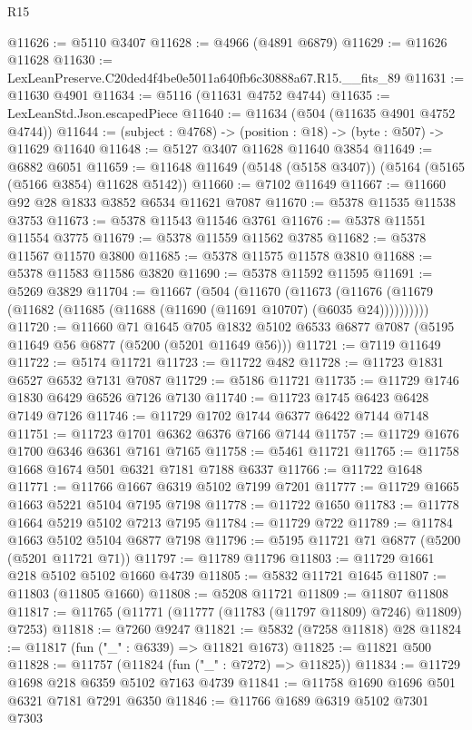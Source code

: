 \begin{lexlean}{R15}
\begin{coremodule}
{{{{{{{{{{{@11626 := @5110 @3407
@11628 := @4966 (@4891 @6879)
@11629 := @11626 @11628
@11630 := LexLeanPreserve.C20ded4f4be0e5011a640fb6c30888a67.R15.__fits_89
@11631 := @11630 @4901
@11634 := @5116 (@11631 @4752 @4744)
@11635 := LexLeanStd.Json.escapedPiece
@11640 := @11634 (@504 (@11635 @4901 @4752 @4744))
@11644 := (subject : @4768) -> (position : @18) -> (byte : @507) -> @11629 @11640
@11648 := @5127 @3407 @11628 @11640 @3854
@11649 := @6882 @6051
@11659 := @11648 @11649 (@5148 (@5158 @3407)) (@5164 (@5165 (@5166 @3854) @11628 @5142))
@11660 := @7102 @11649
@11667 := @11660 @92 @28 @1833 @3852 @6534 @11621 @7087
@11670 := @5378 @11535 @11538 @3753
@11673 := @5378 @11543 @11546 @3761
@11676 := @5378 @11551 @11554 @3775
@11679 := @5378 @11559 @11562 @3785
@11682 := @5378 @11567 @11570 @3800
@11685 := @5378 @11575 @11578 @3810
@11688 := @5378 @11583 @11586 @3820
@11690 := @5378 @11592 @11595
@11691 := @5269 @3829
@11704 := @11667
    (@504
      (@11670
        (@11673 (@11676 (@11679 (@11682 (@11685 (@11688 (@11690 (@11691 @10707) (@6035 @24))))))))))
@11720 := @11660
    @71
    @1645
    @705
    @1832
    @5102
    @6533
    @6877
    @7087
    (@5195 @11649 @56 @6877 (@5200 (@5201 @11649 @56)))
@11721 := @7119 @11649
@11722 := @5174 @11721
@11723 := @11722 @482
@11728 := @11723 @1831 @6527 @6532 @7131 @7087
@11729 := @5186 @11721
@11735 := @11729 @1746 @1830 @6429 @6526 @7126 @7130
@11740 := @11723 @1745 @6423 @6428 @7149 @7126
@11746 := @11729 @1702 @1744 @6377 @6422 @7144 @7148
@11751 := @11723 @1701 @6362 @6376 @7166 @7144
@11757 := @11729 @1676 @1700 @6346 @6361 @7161 @7165
@11758 := @5461 @11721
@11765 := @11758 @1668 @1674 @501 @6321 @7181 @7188 @6337
@11766 := @11722 @1648
@11771 := @11766 @1667 @6319 @5102 @7199 @7201
@11777 := @11729 @1665 @1663 @5221 @5104 @7195 @7198
@11778 := @11722 @1650
@11783 := @11778 @1664 @5219 @5102 @7213 @7195
@11784 := @11729 @722
@11789 := @11784 @1663 @5102 @5104 @6877 @7198
@11796 := @5195 @11721 @71 @6877 (@5200 (@5201 @11721 @71))
@11797 := @11789 @11796
@11803 := @11729 @1661 @218 @5102 @5102 @1660 @4739
@11805 := @5832 @11721 @1645
@11807 := @11803 (@11805 @1660)
@11808 := @5208 @11721
@11809 := @11807 @11808
@11817 := @11765 (@11771 (@11777 (@11783 (@11797 @11809) @7246) @11809) @7253)
@11818 := @7260 @9247
@11821 := @5832 (@7258 @11818) @28
@11824 := @11817 (fun ("_" : @6339) => @11821 @1673)
@11825 := @11821 @500
@11828 := @11757 (@11824 (fun ("_" : @7272) => @11825))
@11834 := @11729 @1698 @218 @6359 @5102 @7163 @4739
@11841 := @11758 @1690 @1696 @501 @6321 @7181 @7291 @6350
@11846 := @11766 @1689 @6319 @5102 @7301 @7303
}}}}}}}}}}}
\end{coremodule}
\end{lexlean}
